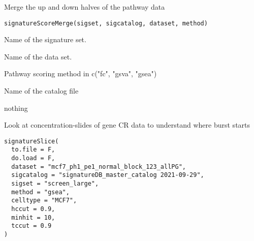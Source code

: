 \documentclass[letterpaper]{book}
\begin{document}
%
\begin{Description}\relax
Merge the up and down halves of the pathway data
\end{Description}
%
\begin{Usage}
\begin{verbatim}
signatureScoreMerge(sigset, sigcatalog, dataset, method)
\end{verbatim}
\end{Usage}
%
\begin{Arguments}
\begin{ldescription}
\item[\code{sigset}] Name of the signature set.

\item[\code{dataset}] Name of the data set.

\item[\code{method}] Pathway scoring method in c("fc", "gsva", "gsea")

\item[\code{sigcatlog}] Name of the catalog file
\end{ldescription}
\end{Arguments}
%
\begin{Value}
nothing
\end{Value}
%
\begin{Description}\relax
Look at concentration-slides of gene CR data to understand where burst starts
\end{Description}
%
\begin{Usage}
\begin{verbatim}
signatureSlice(
  to.file = F,
  do.load = F,
  dataset = "mcf7_ph1_pe1_normal_block_123_allPG",
  sigcatalog = "signatureDB_master_catalog 2021-09-29",
  sigset = "screen_large",
  method = "gsea",
  celltype = "MCF7",
  hccut = 0.9,
  minhit = 10,
  tccut = 0.9
)
\end{verbatim}
\end{Usage}
%
\end{document}
